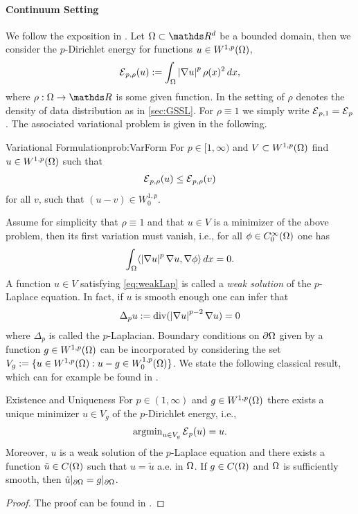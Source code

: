 \paragraph{Continuum Setting}
We follow the exposition in \cite{lindqvist2017notes}. Let $\domain\subset\R^d$ be a bounded domain, then we consider the $p$-Dirichlet energy for functions $u\in W^{1,p}(\Omega)$,
%
\begin{align}\label{eq:DirichletEnergy}
	\mathcal{E}{}_{p,\rho}(u) := \int_\Omega \left|\nabla u\right|^p \rho(x)^2 \, dx,
\end{align}
%
%
where $\rho:\domain\to\R$ is some given function. In the setting of \cite{GarcSlep15, slepcev2019analysis} $\rho$ denotes the density of data distribution as in \cref{sec:GSSL}. For $\rho\equiv1$ we simply write $\mathcal{E}{}_{p,1}=\mathcal{E}{}_{p}$. The associated variational problem is given in the following.
%
\begin{problem}{Variational Formulation}{prob:VarForm}
	For $p\in [1,\infty)$ and $V\subset W^{1,p}(\Omega)$ find $u\in W^{1,p}(\Omega)$ such that
	\begin{align*}
		\mathcal{E}{}_{p,\rho}(u) \leq \mathcal{E}{}_{p,\rho}(v)
	\end{align*}
	for all $v$, such that $(u-v)\in W^{1,p}_0$.
\end{problem}
%
\noindent%
Assume for simplicity that $\rho\equiv 1$ and that $u\in V$ is a minimizer of the above problem, then its first variation must vanish, i.e., for all $\phi\in C^\infty_0(\Omega)$ one has
%
\begin{align}\label{eq:weakLap}
	\int_\Omega \langle \left|\nabla u\right|^p \nabla u, \nabla \phi \rangle \, dx = 0.
\end{align}
%
A function $u\in V$ satisfying \cref{eq:weakLap} is called a \emph{weak solution} of the $p$-Laplace equation. In fact, if $u$ 
is smooth enough one can infer that
%
\begin{align}\label{eq:strongLap}
	\Delta_p u := \operatorname{div}(\left|\nabla u\right|^{p-2} \nabla u) = 0
\end{align}
%
where $\Delta_p$ is called the $p$-Laplacian. Boundary conditions on $\partial \Omega$ given by a function $g\in W^{1,p}(\Omega)$  can be incorporated by considering the set
$V_g := \{u\in W^{1,p}(\Omega): u-g \in W^{1,p}_0(\Omega)\}$. 
We state the following classical result, which can for example be found in \cite{lindqvist2017notes}.
%
\begin{theorem}{Existence and Uniqueness}{}
	For $p\in (1,\infty)$ and $g\in W^{1,p}(\Omega)$ there exists a unique minimizer $u\in V_g$ of the $p$-Dirichlet energy, i.e.,
	\begin{align*}
		\operatorname{argmin}_{u\in V_g} \mathcal{E}{}_p(u) = u.
	\end{align*}
	Moreover, $u$ is a weak solution of the $p$-Laplace equation and there exists a function $\tilde{u}\in C(\Omega)$ such that
	$u = \tilde{u}$ a.e. in $\Omega$. If $g\in C(\Omega)$ and $\Omega$ is sufficiently smooth, then 
	$\tilde{u}\vert_{\partial \Omega} = g\vert_{\partial \Omega}$.
\end{theorem}
%
%
\begin{proof}
	The proof can be found in \cite[Thm. 2.16]{lindqvist2017notes}.
\end{proof}
%
%
